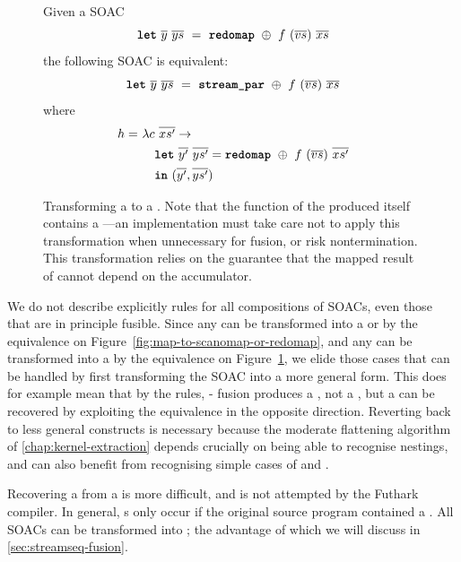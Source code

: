 \begin{figure}[bt]
  Given a SOAC
\[
  \mbox{\texttt{\bfseries{let}}}~\overline{y}~\overline{ys}~=~\mbox{\texttt{\bfseries{redomap}}}~\oplus~f~(\overline{vs})~\overline{xs}
\]
the following SOAC is equivalent:
\[
  \mbox{\texttt{\bfseries{let}}}~\overline{y}~\overline{ys}~=~\mbox{\texttt{\bfseries{stream\_par}}}~\oplus~f~(\overline{vs})~\overline{xs}
\]
where \begin{align*}
        h =~& \lambda c~\overline{xs'} \rightarrow \\
            & \quad \mbox{\texttt{\bfseries{let}}}~\overline{y'}~\overline{ys'} = \mbox{\texttt{\bfseries{redomap}}}~\oplus~f~(\overline{vs})~\overline{xs'} \\
            & \quad \mbox{\texttt{\bfseries{in}}}~(\overline{y'}, \overline{ys'})
  \end{align*}
  \caption{Transforming a  to a \StreamPar.  Note that the
    function of the produced \StreamPar{} itself contains a
    ---an implementation must take care not to apply this
    transformation when unnecessary for fusion, or risk
    nontermination.  This transformation relies on the guarantee that
    the mapped result of  cannot depend on the accumulator.}
  \label{fig:redomap-to-streamred}
\end{figure}

We do not describe explicitly rules for all compositions of SOACs,
even those that are in principle fusible.  Since any  can be
transformed into a  or  by the equivalence on
Figure~\ref{fig:map-to-scanomap-or-redomap}, and any  can
be transformed into a \StreamPar{} by the equivalence on
Figure~\ref{fig:redomap-to-streamred}, we elide those cases that can
be handled by first transforming the SOAC into a more general form.
This does for example mean that by the rules, - fusion
produces a , not a , but a  can be
recovered by exploiting the equivalence in the opposite direction.
Reverting back to less general constructs is necessary because the
moderate flattening algorithm of \cref{chap:kernel-extraction} depends
crucially on being able to recognise  nestings, and can also
benefit from recognising simple cases of  and .

Recovering a  from a \StreamPar{} is more difficult, and is
not attempted by the Futhark compiler.  In general, \StreamPar{}s only
occur if the original source program contained a \StreamRed{}.  All
SOACs can be transformed into \StreamSeq; the advantage of which we
will discuss in \cref{sec:streamseq-fusion}.

